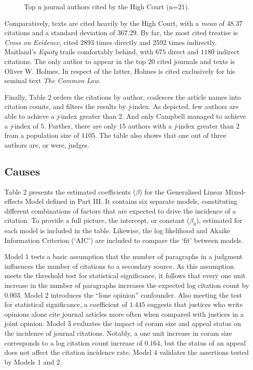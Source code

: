 \begin{figure}[!htpb]
    \centering
    \makebox[\textwidth][c]{}
    \caption{Top n journal authors cited by the High Court (n=$21$).}
\end{figure}

Comparatively, texts are cited heavily by the High Court, with a \emph{mean} of $48.37$ citations and a standard deviation of $367.29$. By far, the most cited treatise is \textit{Cross on Evidence}, cited $2893$ times directly and $2592$ times indirectly. Maitland's  \textit{Equity} trails comfortably behind, with $675$ direct and $1180$ indirect citations. The only author to appear in the top $20$ cited journals and texts is Oliver W. Holmes. In respect of the latter, Holmes is cited exclusively for his seminal text \textit{The Common Law}.

Finally, Table 2 orders the citations by author, coalesces the article names into citation counts, and filters the results by \emph{j}-index. As depicted, few authors are able to achieve a \emph{j}-index greater than 2. And only Campbell managed to achieve a \emph{j}-index of $5$. Further, there are only $15$ authors with a \emph{j}-index greater than $2$ from a population size of $1105$. The table also shows that one out of three authors are, or were, judges.

\subsection{Causes}

Table 2 presents the estimated coefficients ($\beta$) for the Generalised Linear Mixed-effects Model defined in Part III. It contains six separate models, constituting different combinations of factors that are expected to drive the incidence of a citation. To provide a full picture, the intercept, or constant ($\beta_0$), estimated for each model is included in the table. Likewise, the log likelihood and Akaike Information Criterion (`AIC') are included to compare the `fit' between models.

Model 1 tests a basic assumption that the number of paragraphs in a judgment influences the number of citations to a secondary source. As this assumption meets the threshold test for statistical significance, it follows that every one unit increase in the number of paragraphs increases the expected log citation count by $0.003$. Model 2 introduces the ``lone opinion'' confounder. Also meeting the test for statistical significance, a coefficient of $1.445$ suggests that justices who write opinions alone cite journal articles more often when compared with justices in a joint opinion. Model 3 evaluates the impact of coram size and appeal status on the incidence of journal citations. Notably, a one unit increase in coram size corresponds to a log citation count increase of $0.164$, but the status of an appeal does not affect the citation incidence rate. Model 4 validates the assertions tested by Models 1 and 2.

